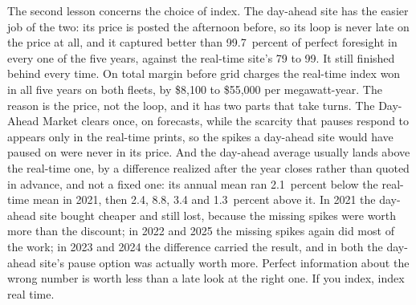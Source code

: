 The second lesson concerns the choice of index. The day-ahead site has the easier job of the two: its price is posted the afternoon before, so its loop is never late on the price at all, and it captured better than 99.7~percent of perfect foresight in every one of the five years, against the real-time site's 79 to 99. It still finished behind every time. On total margin before grid charges the real-time index won in all five years on both fleets, by \$8,100 to \$55,000 per megawatt-year. %
The reason is the price, not the loop, and it has two parts that take turns. The Day-Ahead Market clears once, on forecasts, while the scarcity that pauses respond to appears only in the real-time prints, so the spikes a day-ahead site would have paused on were never in its price. And the day-ahead average usually lands above the real-time one, by a difference realized after the year closes rather than quoted in advance, and not a fixed one: its annual mean ran 2.1~percent below the real-time mean in 2021, then 2.4, 8.8, 3.4 and 1.3~percent above it. %
In 2021 the day-ahead site bought cheaper and still lost, because the missing spikes were worth more than the discount; in 2022 and 2025 the missing spikes again did most of the work; in 2023 and 2024 the difference carried the result, and in both the day-ahead site's pause option was actually worth more. %
Perfect information about the wrong number is worth less than a late look at the right one. If you index, index real time.

